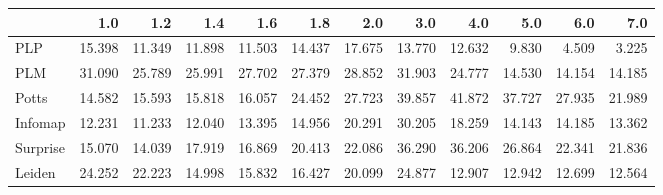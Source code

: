 \begin{tabular}{lrrrrrrrrrrr}
\toprule
{} &    1.0 &    1.2 &    1.4 &    1.6 &    1.8 &    2.0 &    3.0 &    4.0 &    5.0 &    6.0 &    7.0 \\
\midrule
PLP      & 15.398 & 11.349 & 11.898 & 11.503 & 14.437 & 17.675 & 13.770 & 12.632 &  9.830 &  4.509 &  3.225 \\
PLM      & 31.090 & 25.789 & 25.991 & 27.702 & 27.379 & 28.852 & 31.903 & 24.777 & 14.530 & 14.154 & 14.185 \\
Potts    & 14.582 & 15.593 & 15.818 & 16.057 & 24.452 & 27.723 & 39.857 & 41.872 & 37.727 & 27.935 & 21.989 \\
Infomap  & 12.231 & 11.233 & 12.040 & 13.395 & 14.956 & 20.291 & 30.205 & 18.259 & 14.143 & 14.185 & 13.362 \\
Surprise & 15.070 & 14.039 & 17.919 & 16.869 & 20.413 & 22.086 & 36.290 & 36.206 & 26.864 & 22.341 & 21.836 \\
Leiden   & 24.252 & 22.223 & 14.998 & 15.832 & 16.427 & 20.099 & 24.877 & 12.907 & 12.942 & 12.699 & 12.564 \\
\bottomrule
\end{tabular}
